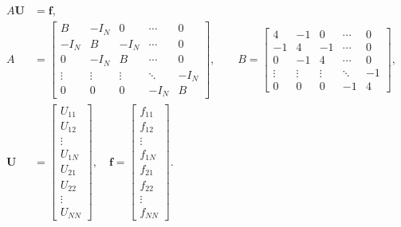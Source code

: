 \begin{align*}
    A \mathbf{U} & = \mathbf{f},                                                                 \\
    A            & = \begin{bmatrix}
                         B      & -I_N   & 0      & \cdots & 0    \\
                         -I_N   & B      & -I_N   & \cdots & 0    \\
                         0      & -I_N   & B      & \cdots & 0    \\
                         \vdots & \vdots & \vdots & \ddots & -I_N \\
                         0      & 0      & 0      & -I_N   & B
                     \end{bmatrix}, \qquad
    B = \begin{bmatrix}
            4      & -1     & 0      & \cdots & 0  \\
            -1     & 4      & -1     & \cdots & 0  \\
            0      & -1     & 4      & \cdots & 0  \\
            \vdots & \vdots & \vdots & \ddots & -1 \\
            0      & 0      & 0      & -1     & 4
        \end{bmatrix},                                                   \\
    \mathbf{U}   & = \begin{bmatrix}
                         U_{11} \\ U_{12} \\ \vdots \\ U_{1N} \\ U_{21} \\ U_{22} \\ \vdots \\ U_{NN}
                     \end{bmatrix}, \quad
    \mathbf{f} = \begin{bmatrix}
                     f_{11} \\ f_{12} \\ \vdots \\ f_{1N} \\ f_{21} \\ f_{22} \\ \vdots \\ f_{NN}
                 \end{bmatrix}.
\end{align*}

